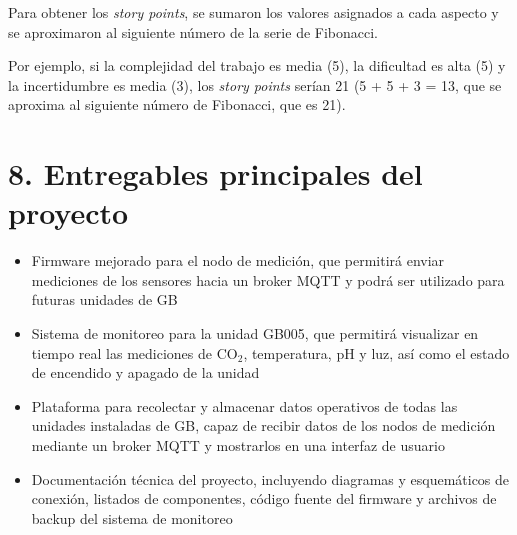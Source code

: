 \documentclass[
11pt, %
]{charter}
\begin{document}
Para obtener los \textit{story points}, se sumaron los valores asignados a cada aspecto y se aproximaron al siguiente número de la serie de Fibonacci.

Por ejemplo, si la complejidad del trabajo es media (5), la dificultad es alta (5) y la incertidumbre es media (3), los \textit{story points} serían 21 (5 + 5 + 3 = 13, que se aproxima al siguiente número de Fibonacci, que es 21).

\section{8. Entregables principales del proyecto}
\label{sec:entregables}
\begin{itemize}
\item Firmware mejorado para el nodo de medición, que permitirá enviar mediciones de los sensores hacia un broker MQTT y podrá ser utilizado para futuras unidades de GB

\item Sistema de monitoreo para la unidad GB005, que permitirá visualizar en tiempo real las mediciones de CO$_2$, temperatura, pH y luz, así como el estado de encendido y apagado de la unidad

\item Plataforma para recolectar y almacenar datos operativos de todas las unidades instaladas de GB, capaz de recibir datos de los nodos de medición mediante un broker MQTT y mostrarlos en una interfaz de usuario

\item Documentación técnica del proyecto, incluyendo diagramas y esquemáticos de conexión, listados de componentes, código fuente del firmware y archivos de backup del sistema de monitoreo
\end{itemize}
\end{document}
